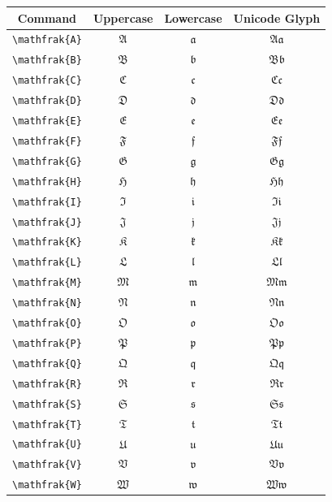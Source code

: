 \documentclass[12pt,a4paper]{article}
\begin{document}
\begin{longtable}{|c|c|c|c|}
\hline
\textbf{Command} & \textbf{Uppercase} & \textbf{Lowercase} & \textbf{Unicode Glyph} \\
\hline
\verb|\mathfrak{A}| & $\mathfrak{A}$ & $\mathfrak{a}$ & $ 𝔄 𝔞 $ \\
\verb|\mathfrak{B}| & $\mathfrak{B}$ & $\mathfrak{b}$ & $ 𝔅 𝔟 $ \\
\verb|\mathfrak{C}| & $\mathfrak{C}$ & $\mathfrak{c}$ & $ ℭ 𝔠 $ \\
\verb|\mathfrak{D}| & $\mathfrak{D}$ & $\mathfrak{d}$ & $ 𝔇 𝔡 $ \\
\verb|\mathfrak{E}| & $\mathfrak{E}$ & $\mathfrak{e}$ & $ 𝔈 𝔢 $ \\
\verb|\mathfrak{F}| & $\mathfrak{F}$ & $\mathfrak{f}$ & $ 𝔉 𝔣 $ \\
\verb|\mathfrak{G}| & $\mathfrak{G}$ & $\mathfrak{g}$ & $ 𝔊 𝔤 $ \\
\verb|\mathfrak{H}| & $\mathfrak{H}$ & $\mathfrak{h}$ & $ ℌ 𝔥 $ \\
\verb|\mathfrak{I}| & $\mathfrak{I}$ & $\mathfrak{i}$ & $ ℑ 𝔦 $ \\
\verb|\mathfrak{J}| & $\mathfrak{J}$ & $\mathfrak{j}$ & $ 𝔍 𝔧 $ \\
\verb|\mathfrak{K}| & $\mathfrak{K}$ & $\mathfrak{k}$ & $ 𝔎 𝔨 $ \\
\verb|\mathfrak{L}| & $\mathfrak{L}$ & $\mathfrak{l}$ & $ 𝔏 𝔩 $ \\
\verb|\mathfrak{M}| & $\mathfrak{M}$ & $\mathfrak{m}$ & $ 𝔐 𝔪 $ \\
\verb|\mathfrak{N}| & $\mathfrak{N}$ & $\mathfrak{n}$ & $ 𝔑 𝔫 $ \\
\verb|\mathfrak{O}| & $\mathfrak{O}$ & $\mathfrak{o}$ & $ 𝔒 𝔬 $ \\
\verb|\mathfrak{P}| & $\mathfrak{P}$ & $\mathfrak{p}$ & $ 𝔓 𝔭 $ \\
\verb|\mathfrak{Q}| & $\mathfrak{Q}$ & $\mathfrak{q}$ & $ 𝔔 𝔮 $ \\
\verb|\mathfrak{R}| & $\mathfrak{R}$ & $\mathfrak{r}$ & $ ℜ 𝔯 $ \\
\verb|\mathfrak{S}| & $\mathfrak{S}$ & $\mathfrak{s}$ & $ 𝔖 𝔰 $ \\
\verb|\mathfrak{T}| & $\mathfrak{T}$ & $\mathfrak{t}$ & $ 𝔗 𝔱 $ \\
\verb|\mathfrak{U}| & $\mathfrak{U}$ & $\mathfrak{u}$ & $ 𝔘 𝔲 $ \\
\verb|\mathfrak{V}| & $\mathfrak{V}$ & $\mathfrak{v}$ & $ 𝔙 𝔳 $ \\
\verb|\mathfrak{W}| & $\mathfrak{W}$ & $\mathfrak{w}$ & $ 𝔚 𝔴 $ \\

\end{longtable}
\end{document}
